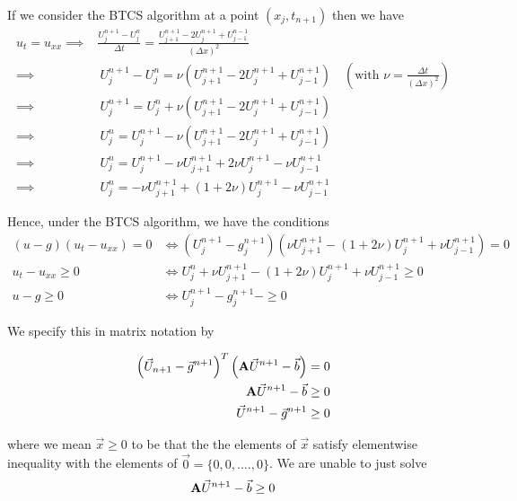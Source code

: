 \documentclass[12pt]{article}
\begin{document}
If we consider the BTCS algorithm at a point $(x_j, t_{n + 1})$ then we have
\begin{align*}
	u_t = u_{xx} \implies& \frac{U^{n + 1}_j - U^n_j}{\Delta t} = \frac{ U^{n + 1}_{j + 1} - 2U^{n + 1}_j + U^{n - 1}_{j - 1} }{(\Delta x)^2} \\
	\implies&~U^{n + 1}_j - U^n_j = \nu \left( U^{n + 1}_{j + 1} - 2 U^{n + 1}_j + U^{n + 1}_{j - 1} \right)  \quad \left(\text{with }\nu = \frac{\Delta t}{(\Delta x)^2} \right) \\
	\implies&~U^{n + 1}_j = U^n_j + \nu \left( U^{n + 1}_{j + 1} - 2 U^{n + 1}_j + U^{n + 1}_{j - 1} \right) \\
	\implies&~U^n_j = U^{n + 1}_j - \nu \left( U^{n + 1}_{j + 1} - 2 U^{n + 1}_j + U^{n + 1}_{j - 1} \right) \\
	\implies&~U^n_j = U^{n + 1}_j - \nu U^{n + 1}_{j + 1} + 2\nu U^{n + 1}_j -\nu U^{n + 1}_{j - 1}  \\
\implies&~U^n_j = - \nu U^{n + 1}_{j + 1} + (1 + 2\nu) U^{n + 1}_j -\nu U^{n + 1}_{j - 1} 
\end{align*}

Hence, under the BTCS algorithm, we have the conditions
\begin{align*} 
	(u - g)(u_t - u_{xx}) = 0 &\iff \left( U^{n + 1}_j - g^{n + 1}_j \right) \left( \nu U^{n + 1}_{j + 1} - (1 + 2\nu) U^{n + 1}_j + \nu U^{n + 1}_{j - 1}  \right) = 0 \\
	u_t - u_{xx} \geq 0 &\iff U^n_j + \nu U^{n + 1}_{j + 1} - (1 + 2\nu) U^{n + 1}_j + \nu U^{n + 1}_{j - 1} \geq 0 \\
	u - g \geq 0 &\iff U^{n + 1}_j - g^{n + 1}_j - \geq 0
\end{align*}

We specify this in matrix notation by

\begin{align*}
	\left( \vec{U}_{n + 1} - \vec{g}^{n + 1} \right)^T \left( {\bf A}\vec{U}^{n + 1} - \vec{b} \right) &= 0 \\
	{\bf A}\vec{U}^{n + 1} - \vec{b} &\geq 0 \\
	\vec{U}^{n + 1} - \vec{g}^{n + 1} &\geq 0
\end{align*}

where we mean $\vec{x} \geq 0$ to be that the the elements of $\vec{x}$ satisfy elementwise inequality with the elements of $\vec{0} = \{0, 0, ...., 0\}$. We are unable to just solve 
\begin{equation*}
	{\bf A}\vec{U}^{n + 1} - \vec{b} \geq 0 \\
\end{equation*}
\end{document}
